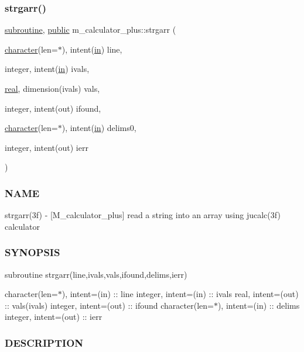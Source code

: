 \subsubsection{\texorpdfstring{strgarr()}{strgarr()}}
{\footnotesize\ttfamily \hyperlink{M__stopwatch_83_8txt_acfbcff50169d691ff02d4a123ed70482}{subroutine}, \hyperlink{M__stopwatch_83_8txt_a2f74811300c361e53b430611a7d1769f}{public} m\+\_\+calculator\+\_\+plus\+::strgarr (\begin{DoxyParamCaption}\item[{\hyperlink{option__stopwatch_83_8txt_abd4b21fbbd175834027b5224bfe97e66}{character}(len=$\ast$), intent(\hyperlink{M__journal_83_8txt_afce72651d1eed785a2132bee863b2f38}{in})}]{line,  }\item[{integer, intent(\hyperlink{M__journal_83_8txt_afce72651d1eed785a2132bee863b2f38}{in})}]{ivals,  }\item[{\hyperlink{read__watch_83_8txt_abdb62bde002f38ef75f810d3a905a823}{real}, dimension(ivals)}]{vals,  }\item[{integer, intent(out)}]{ifound,  }\item[{\hyperlink{option__stopwatch_83_8txt_abd4b21fbbd175834027b5224bfe97e66}{character}(len=$\ast$), intent(\hyperlink{M__journal_83_8txt_afce72651d1eed785a2132bee863b2f38}{in})}]{delims0,  }\item[{integer, intent(out)}]{ierr }\end{DoxyParamCaption})}



\subsubsection*{N\+A\+ME}

strgarr(3f) -\/ \mbox{[}M\+\_\+calculator\+\_\+plus\mbox{]} read a string into an array using jucalc(3f) calculator \subsubsection*{S\+Y\+N\+O\+P\+S\+IS}

subroutine strgarr(line,ivals,vals,ifound,delims,ierr)

character(len=$\ast$), intent=(in) \+:\+: line integer, intent=(in) \+:\+: ivals real, intent=(out) \+:\+: vals(ivals) integer, intent=(out) \+:\+: ifound character(len=$\ast$), intent=(in) \+:\+: delims integer, intent=(out) \+:\+: ierr

\subsubsection*{D\+E\+S\+C\+R\+I\+P\+T\+I\+ON}

